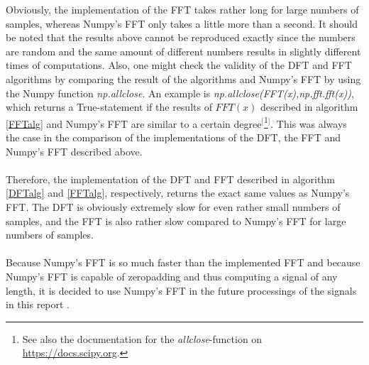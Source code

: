 Obviously, the implementation of the FFT takes rather long for large numbers of samples, whereas Numpy's FFT only takes a little more than a second. It should be noted that the results above cannot be reproduced exactly since the numbers are random and the same amount of different numbers results in slightly different times of computations. Also, one might check the validity of the DFT and FFT algorithms by comparing the result of the algorithms and Numpy's FFT by using the Numpy function \textit{np.allclose}. An example is \textit{np.allclose(FFT(x),np.fft.fft(x))}, which returns a True-statement if the results of $FFT(x)$ described in algorithm \ref{FFTalg} and Numpy's FFT are similar to a certain degree$^[$\footnote{See also the documentation for the \textit{allclose}-function on \href{https://docs.scipy.org/doc/numpy/reference/generated/numpy.allclose.html}{https://docs.scipy.org}.}$^]$. This was always the case in the comparison of the implementations of the DFT, the FFT and Numpy's FFT described above.
\\ \\
Therefore, the implementation of the DFT and FFT described in algorithm \ref{DFTalg} and \ref{FFTalg}, respectively, returns the exact same values as Numpy's FFT. The DFT is obviously extremely slow for even rather small numbers of samples, and the FFT is also rather slow compared to Numpy's FFT for large numbers of samples.
\\ \\
Because Numpy's FFT is so much faster than the implemented FFT and because Numpy's FFT is capable of zeropadding and thus computing a signal of any length, it is decided to use Numpy's FFT in the future processings of the signals in this report .